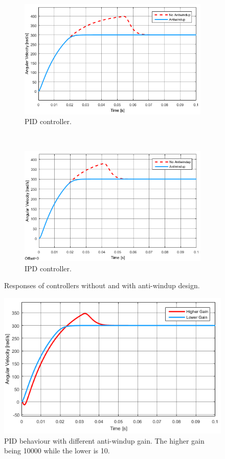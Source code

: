 \begin{figure}
	\centering
	\begin{subfigure}[b]{0.45\textwidth}
		\includegraphics[width=\textwidth]{graphics/pidwindupresponse}
		\caption{PID controller.}
		\label{fig:pidwindupresponse}
	\end{subfigure}
	~ %
	\begin{subfigure}[b]{0.45\textwidth}
		\includegraphics[width=\textwidth]{graphics/ipdwindupresponse}
		\caption{IPD controller.}
		\label{fig:ipdwindupresponse}
	\end{subfigure}
	\caption{Responses of controllers without and with anti-windup design.}\label{fig:antiwindupresponses}
\end{figure}

\begin{figure}[!h]
	\centering
	\includegraphics[width=.6\linewidth]{graphics/pidwindupvaluecomp}
	\caption{PID behaviour with different anti-windup gain. The higher gain being 10000 while the lower is 10.}
	\label{fig:pidwindupvaluecomp}
\end{figure}

